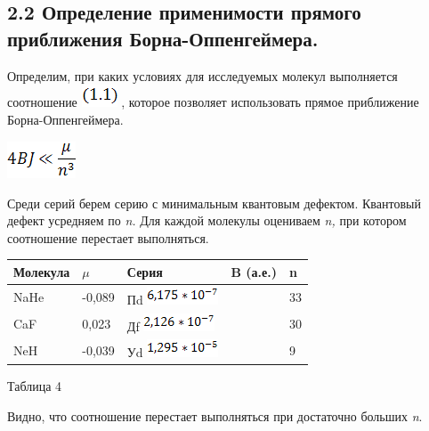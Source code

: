 \documentclass{article}
\begin{document}
\vspace{10pt}
\subsection*{{\large{}{\color{color18} \textbf{2.2 Определение применимости 
прямого приближения Борна-Оппенгеймера.}}}}

\vspace{10pt}
\baselineskip=13pt
\leftskip=0pt
{\large{}Определим, при каких условиях для исследуемых 
молекул выполняется соотношение }
\includegraphics[width=30pt, height=19pt, keepaspectratio=true]{7-fig020.png}
{\large{}, которое позволяет использовать прямое 
приближение Борна-Оппенгеймера.}

\vspace{10pt}
\includegraphics[width=58pt, height=31pt, keepaspectratio=true]{7-fig021.png}

\vspace{23pt}
{\large{}Среди серий берем серию с минимальным 
квантовым дефектом. Квантовый дефект усредняем 
по }{\large{}\textit{n.}}{\large{} Для каждой молекулы оцениваем 
}{\large{}\textit{n, }}{\large{}при котором соотношение перестает 
выполняться.}

\vspace{10pt}
\begin{tabular}{|>{\raggedright}p{39pt}|>{\raggedright}p{34pt}|>{\raggedright}p{52pt}|>{\raggedright}p{72pt}|>{\raggedright}p{85pt}|}
\hline
М\textbf{олекула} & \ensuremath{\mu} & С\textbf{ерия} & B\textbf{ 
(а.е.)} & n\tabularnewline
\hline
NaHe & -0,089 & Пd
\includegraphics[width=60pt, height=15pt, keepaspectratio=true]{7-fig022.png}
 &  & 33\tabularnewline
\hline
CaF & 0,023 & Дf
\includegraphics[width=60pt, height=15pt, keepaspectratio=true]{7-fig023.png}
 &  & 30\tabularnewline
\hline
NeH & -0,039 & Уd
\includegraphics[width=60pt, height=15pt, keepaspectratio=true]{7-fig024.png}
 &  & 9\tabularnewline
\hline
\end{tabular}

\vspace{10pt}
\begin{center}
Таблица 4
\end{center}

\vspace{10pt}
\baselineskip=13pt
\leftskip=0pt
{\large{}Видно, что соотношение перестает выполняться 
при достаточно больших }{\large{}\textit{n}}{\large{}.}

\newpage
\end{document}
